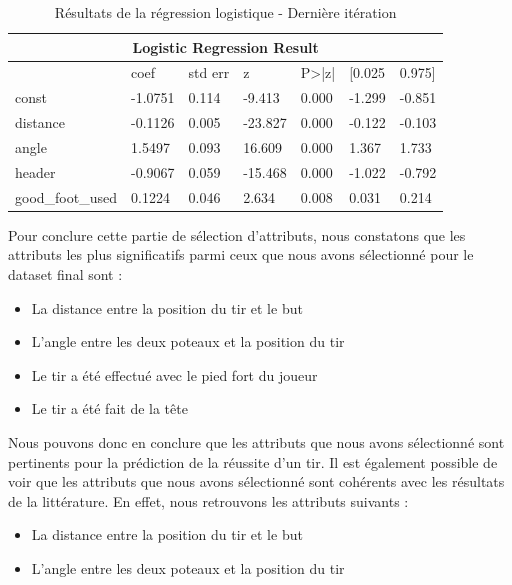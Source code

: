 \documentclass[12pt]{article}
\begin{document}
\begin{table}[htp]
    \centering
    \begin{tabular}{lllllll}
    \multicolumn{7}{c}{\textbf{Logistic Regression Result}}                                   \\ \hline
                     & coef    & std err & z       & P\textgreater{}|z| & {[}0.025 & 0.975{]} \\ \hline
    const            & -1.0751 & 0.114   & -9.413  & 0.000              & -1.299   & -0.851   \\
    distance         & -0.1126 & 0.005   & -23.827 & 0.000              & -0.122   & -0.103   \\
    angle            & 1.5497  & 0.093   & 16.609  & 0.000              & 1.367    & 1.733    \\
    header           & -0.9067 & 0.059   & -15.468 & 0.000              & -1.022   & -0.792   \\
    good\_foot\_used & 0.1224  & 0.046   & 2.634   & 0.008              & 0.031    & 0.214    \\ \hline
    \end{tabular}
    \caption{Résultats de la régression logistique - Dernière itération}
    \label{tab:logistic_regression_result_6}
\end{table}
\newpage
Pour conclure cette partie de sélection d'attributs, nous constatons que les attributs les plus significatifs parmi ceux que nous avons sélectionné pour le dataset final sont :
\begin{itemize}
    \item La distance entre la position du tir et le but
    \item L'angle entre les deux poteaux et la position du tir
    \item Le tir a été effectué avec le pied fort du joueur
    \item Le tir a été fait de la tête
\end{itemize}
Nous pouvons donc en conclure que les attributs que nous avons sélectionné sont pertinents pour la prédiction de la réussite d'un tir. 
Il est également possible de voir que les attributs que nous avons sélectionné sont cohérents avec les résultats de la littérature. 
En effet, nous retrouvons les attributs suivants :
\begin{itemize}
    \item La distance entre la position du tir et le but
    \item L'angle entre les deux poteaux et la position du tir
\end{itemize}
\end{document}

